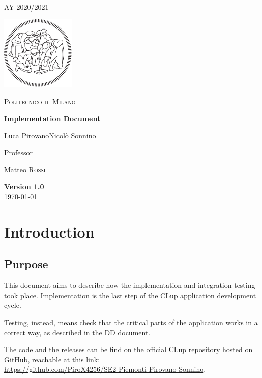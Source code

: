 \documentclass[table, 12pt]{article}
\begin{document}
\begin{titlepage}
    \centering
    {\scshape\large AY 2020/2021 \par}
    \vfill
    \includegraphics[width=100pt]{assets/logo-polimi-new}\par\vspace{1cm}
    {\scshape\LARGE Politecnico di Milano \par}
    \vspace{1.5cm}
    {\huge\bfseries Implementation Document \par}
    \vspace{2cm}
    {\Large {Luca Pirovano\quad Nicolò Sonnino}\par}
    \vfill
    {\large Professor\par
        Matteo \textsc{Rossi}}
    \vfill
    {\large \textbf{Version 1.0} \\ \today \par}
\end{titlepage}
\thispagestyle{plain}
\mbox{}
\newpage
{}
\tableofcontents
\newpage
{}

\section{Introduction}
\subsection{Purpose}
This document aims to describe how the implementation and integration testing took place.
Implementation is the last step of the CLup application development cycle.

Testing, instead, means check that the critical parts of the application works in a correct way, as described in the DD document.

The code and the releases can be find on the official CLup repository hosted on GitHub, reachable at this link:\\ \href{https://github.com/PiroX4256/SE2-Piemonti-Pirovano-Sonnino}{https://github.com/PiroX4256/SE2-Piemonti-Pirovano-Sonnino}.
\end{document}
